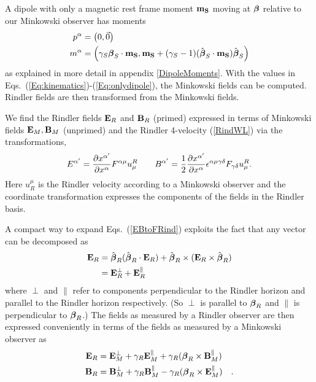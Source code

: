 A dipole with only a magnetic rest frame moment $\bf{m_S}$
moving at ${\boldsymbol \beta}$ relative to our Minkowski observer has moments
\begin{align}
\label{Eq:onlydipole}
p^{\alpha} &=  \left ( 0, \vec 0\right ) \\
m^{\alpha} &=  \left ( \gamma_S {\boldsymbol \beta}_S \cdot {\bf{m_S}}, {\bf{m_S}}
  +(\gamma_S -1)(\hat{\boldsymbol \beta}_S \cdot \mathbf{m_S}) \hat{\boldsymbol \beta}_S   \right) \nonumber
\end{align}
as explained in more detail in appendix \ref{DipoleMoments}.
With the values in Eqs.\ (\ref{Eq:kinematics})-(\ref{Eq:onlydipole}), the
Minkowski fields can be
computed. Rindler fields are then transformed from the Minkowski
fields. 



We find the Rindler fields ${\bf E}_R$ and ${\bf B}_R$ (primed)
expressed in terms of Minkowski fields ${\bf E}_M,{\bf B}_M$ (unprimed) and the Rindler 4-velocity (\ref{RindWL}) via the transformations,
\begin{align}
E^{\alpha'} = \frac{\partial x^{\alpha'}}{\partial x^{\alpha}}
F^{\alpha \mu} u^R_{\mu}     \hbox{  } \hbox{  }  \hbox{  } \hbox{  }
\hbox{  } \hbox{  }  B^{\alpha'} = \frac{1}{2} \frac{\partial
  x^{\alpha'}}{\partial x^{\alpha}} \epsilon^{\alpha \mu \gamma
  \delta}F_{\gamma \delta} u^R_{\mu}.
\label{EBtoFRind}
\end{align}
Here $u_R^\mu$ is the Rindler velocity according to a Minkowski observer and
the coordinate transformation expresses the components of the fields in the Rindler
basis.

A compact way to expand Eqs.\ (\ref{EBtoFRind}) exploits the fact that any vector can be decomposed as
\begin{align}
{\bf E}_R & = \hat{\boldsymbol \beta}_R(\hat{\boldsymbol \beta}_R\cdot {\bf E}_R) +\hat{\boldsymbol \beta}_R\times ({\bf E}_R\times\hat{\boldsymbol \beta}_R) \nonumber \\
& = {\bf E}_R^\perp +{\bf E}_R^\parallel
\label{Eq:defperp}
\end{align}
where $\perp$ and $\parallel$ refer to components perpendicular to the Rindler
horizon and parallel to the Rindler horizon respectively. (So $\perp$
is parallel to ${\boldsymbol \beta}_R$ and $\parallel$ is perpendicular to ${\boldsymbol \beta}_R$.) 
The fields as measured by a Rindler observer are then expressed
conveniently in terms of
the fields as measured by a Minkowski observer as
\begin{align}
{\bf E}_R & ={\bf E}_M^{\perp} +\gamma_R{\bf E}_M^{\parallel} +\gamma_R({\boldsymbol \beta}_R\times {\bf B}_M^{\parallel}) \nonumber \\ 
{\bf B}_R & ={\bf B}_M^{\perp} +\gamma_R{\bf B}_M^{\parallel} -\gamma_R({\boldsymbol \beta}_R\times
{\bf E}_M^{\parallel})  \quad .
\label{Eq:trans}
\end{align}



